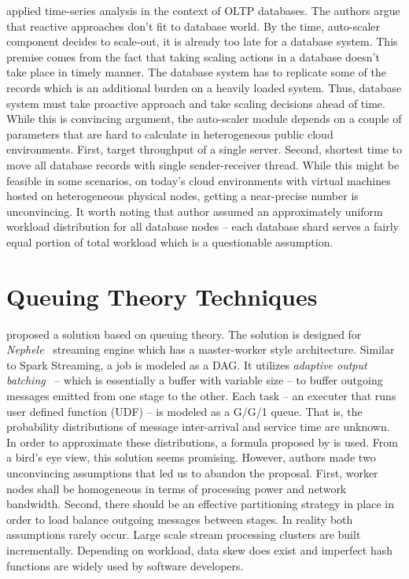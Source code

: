 \textcite{Taft:2018} applied time-series analysis in the context of OLTP databases. The authors argue that reactive approaches don't fit to database world. By the time, auto-scaler component decides to scale-out, it is already too late for a database system. This premise comes from the fact that taking scaling actions in a database doesn't take place in timely manner. The database system has to replicate some of the records which is an additional burden on a heavily loaded system. Thus, database system must take proactive approach and take scaling decisions ahead of time. While this is convincing argument, the auto-scaler module depends on a couple of parameters that are hard to calculate in heterogeneous public cloud environments. First, target throughput of a single server. Second, shortest time to move all database records with single sender-receiver thread. While this might be feasible in some scenarios, on today's cloud environments with virtual machines hosted on heterogeneous physical nodes, getting a near-precise number is unconvincing. It worth noting that author assumed an approximately uniform workload distribution for all database nodes -- each database shard serves a fairly equal portion of total workload which is a questionable assumption.

\section{Queuing Theory Techniques}
\label{related:qt}

\textcite{Lohrmann:2015} proposed a solution based on queuing theory. The solution is designed for \emph{Nephele}~\cite{Lohrmann:2014} streaming engine which has a master-worker style architecture. Similar to Spark Streaming, a job is modeled as a DAG. It utilizes \emph{adaptive output batching}~\cite{Warneke:2011} -- which is essentially a buffer with variable size -- to buffer outgoing messages emitted from one stage to the other. Each task -- an executer that runs user defined function (UDF) -- is modeled as a G/G/1 queue. That is, the probability distributions of message inter-arrival and service time are unknown. In order to approximate these distributions, a formula proposed by \textcite{Kingman:1961} is used. From a bird's eye view, this solution seems promising. However, authors made two unconvincing assumptions that led us to abandon the proposal. First, worker nodes shall be homogeneous in terms of processing power and network bandwidth. Second, there should be an effective partitioning strategy in place in order to load balance outgoing messages between stages. In reality both assumptions rarely occur. Large scale stream processing clusters are built incrementally. Depending on workload, data skew does exist and imperfect hash functions are widely used by software developers.

